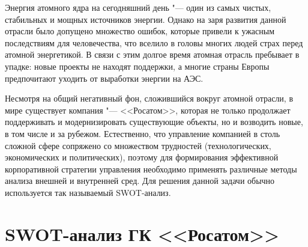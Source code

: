 



Энергия атомного ядра на сегодняшний день "--- один из самых чистых, стабильных и мощных источников энергии. Однако на заря развития данной отрасли было допущено множество ошибок, которые привели к ужасным последствиям для человечества, что вселило в головы многих людей страх перед атомной энергетикой. В связи с этим долгое время атомная отрасль пребывает в упадке: новые проекты не находят поддержки, а многие страны Европы предпочитают уходить от выработки энергии на АЭС.

Несмотря на общий негативный фон, сложившийся вокруг атомной отрасли, в мире существует компания "--- <<Росатом>>, которая не только продолжает поддерживать и модернизировать существующие объекты, но и возводить новые, в том числе и за рубежом. Естественно, что управление компанией в столь сложной сфере сопряжено со множеством трудностей (технологических, экономических и политических), поэтому для формирования эффективной корпоративной стратегии управления необходимо применять различные методы анализа внешней и внутренней сред. Для решения данной задачи обычно используется так называемый SWOT-анализ.

\section{SWOT-анализ ГК <<Росатом>>}

